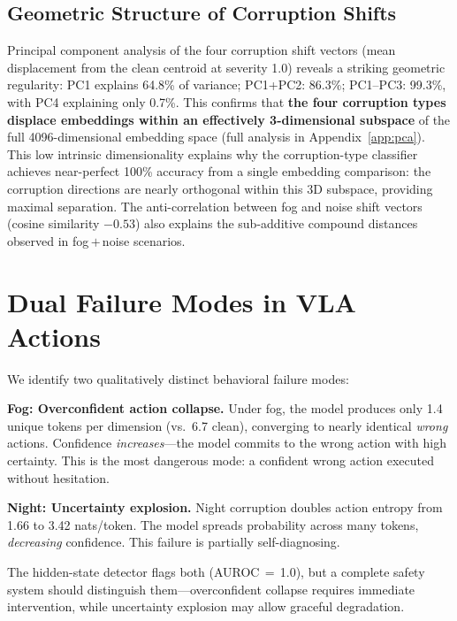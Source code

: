 \documentclass[11pt]{article}
\begin{document}
\subsection{Geometric Structure of Corruption Shifts}

Principal component analysis of the four corruption shift vectors (mean displacement from the clean centroid at severity 1.0) reveals a striking geometric regularity: PC1 explains 64.8\% of variance; PC1+PC2: 86.3\%; PC1--PC3: 99.3\%, with PC4 explaining only 0.7\%.
This confirms that \textbf{the four corruption types displace embeddings within an effectively 3-dimensional subspace} of the full 4096-dimensional embedding space (full analysis in Appendix~\ref{app:pca}).
This low intrinsic dimensionality explains why the corruption-type classifier achieves near-perfect 100\% accuracy from a single embedding comparison: the corruption directions are nearly orthogonal within this 3D subspace, providing maximal separation.
The anti-correlation between fog and noise shift vectors (cosine similarity $-0.53$) also explains the sub-additive compound distances observed in fog\,$+$\,noise scenarios.

\section{Dual Failure Modes in VLA Actions}
\label{sec:failure_modes}

We identify two qualitatively distinct behavioral failure modes:

\textbf{Fog: Overconfident action collapse.}
Under fog, the model produces only 1.4 unique tokens per dimension (vs.\ 6.7 clean), converging to nearly identical \emph{wrong} actions.
Confidence \emph{increases}---the model commits to the wrong action with high certainty.
This is the most dangerous mode: a confident wrong action executed without hesitation.

\textbf{Night: Uncertainty explosion.}
Night corruption doubles action entropy from 1.66 to 3.42 nats/token.
The model spreads probability across many tokens, \emph{decreasing} confidence.
This failure is partially self-diagnosing.

The hidden-state detector flags both (AUROC\,$=$\,1.0), but a complete safety system should distinguish them---overconfident collapse requires immediate intervention, while uncertainty explosion may allow graceful degradation.
\end{document}
